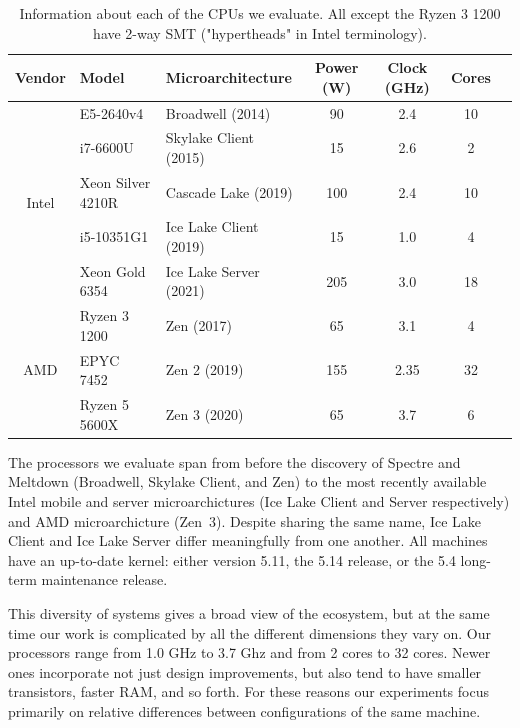 \begin{table}[t]
    \begin{center}
    \begin{tabular}{ cllcccc }
      \textbf{Vendor} & \textbf{Model} & \textbf{Microarchitecture} & \textbf{Power (W)} & \textbf{Clock (GHz)} & \textbf{Cores} \\ \hline 
        \multirow{5}{*}{Intel} & E5-2640v4         & Broadwell (2014)          & 90 & 2.4 & 10 \\
                               & i7-6600U          & Skylake Client (2015)   & 15 & 2.6 & 2 \\
                               & Xeon Silver 4210R & Cascade Lake (2019)       & 100 & 2.4 & 10 \\
                               & i5-10351G1        & Ice Lake Client (2019)  & 15 & 1.0 & 4 \\
                               & Xeon Gold 6354    & Ice Lake Server (2021)  & 205 & 3.0 & 18 \\ \hline
        \multirow{3}{*}{AMD}   & Ryzen 3 1200      & Zen (2017)                & 65 & 3.1 & 4 \\
                               & EPYC 7452         & Zen 2 (2019)              & 155 & 2.35 & 32 \\
                               & Ryzen 5 5600X     & Zen 3 (2020)              & 65 & 3.7 & 6 \\ \hline
    \end{tabular}
    \end{center}
    \caption{Information about each of the CPUs we evaluate. All except the Ryzen 3 1200 have 2-way SMT ("hypertheads" in Intel terminology).}
    \label{fig:cpus}
  \end{table}

The processors we evaluate span from before the discovery of Spectre and Meltdown (Broadwell, Skylake Client, and Zen) to the most recently available Intel mobile and server microarchictures (Ice Lake Client and Server respectively) and AMD microarchicture (Zen~3).
Despite sharing the same name, Ice Lake Client and Ice Lake Server differ meaningfully from one another.
All machines have an up-to-date kernel: either version 5.11, the 5.14 release, or the 5.4 long-term maintenance release.

This diversity of systems gives a broad view of the ecosystem, but at the same time our work is complicated by all the different dimensions they vary on.
Our processors range from 1.0 GHz to 3.7 Ghz and from 2 cores to 32 cores.
Newer ones incorporate not just design improvements, but also tend to have smaller transistors, faster RAM, and so forth.
For these reasons our experiments focus primarily on relative differences between configurations of the same machine.

